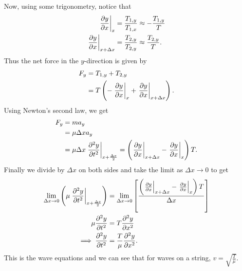 \documentclass[../classical_mechanics.tex]{subfiles}
\begin{document}
        Now, using some trigonometry, notice that
        \begin{align}
            \left.\pdv{y}{x}\right|_x&=\frac{T_{1,y}}{T_{1,x}}\approx -\frac{T_{1,y}}{T}\\
            \left.\pdv{y}{x}\right|_{x+\Delta x}&=\frac{T_{2,y}}{T_{2,y}}\approx\frac{T_{2,y}}{T}.
        \end{align}
        Thus the net force in the $y$-direction is given by
        \begin{align}
            F_y&=T_{1,y}+T_{2,y}\\
            &=T\left(-\left.\pdv{y}{x}\right|_x+\left.\pdv{y}{x}\right|_{x+\Delta x}\right).
        \end{align}
        Using Newton's second law, we get
        \begin{align}
            F_y&=ma_y\\
            &=\mu\Delta xa_y\\
            &=\mu\Delta x\left.\pdv[2]{y}{t}\right|_{x+\frac{\Delta x}{2}}=\left(\left.\pdv{y}{x}\right|_{x+\Delta x}-\left.\pdv{y}{x}\right|_x\right)T.
        \end{align}
        Finally we divide by $\Delta x$ on both sides and take the limit as $\Delta x\to0$ to get
        \begin{align}
            \lim_{\Delta x\to0}\left(\mu\left.\pdv[2]{y}{t}\right|_{x+\frac{\Delta x}{2}}\right)&=\lim_{\Delta x\to0}\left[\frac{\left(\left.\pdv{y}{x}\right|_{x+\Delta x}-\left.\pdv{y}{x}\right|_x\right)T}{\Delta x}\right]\\
            \mu\pdv[2]{y}{t}&=T\pdv[2]{y}{x}\\
            \implies\pdv[2]{y}{t}&=\frac{T}{\mu}\pdv[2]{y}{x}.
        \end{align}
        This is the wave equations and we can see that for waves on a string, $v=\sqrt{\frac{T}{\mu}}$.
\end{document}
